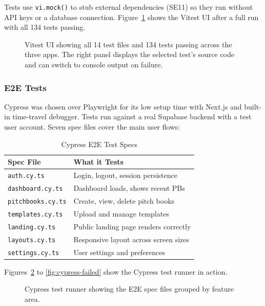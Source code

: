 Tests use \texttt{vi.mock()} to stub external dependencies (SE11) so they run without API keys or a database connection. Figure~\ref{fig:vitest-ui} shows the Vitest UI after a full run with all 134 tests passing.

\begin{figure}[H]
\centering
{}
\caption{Vitest UI showing all 14 test files and 134 tests passing across the three apps. The right panel displays the selected test's source code and can switch to console output on failure.}
\label{fig:vitest-ui}
\end{figure}

\subsubsection{E2E Tests}

Cypress \parencite{cypress2024} was chosen over Playwright for its low setup time with Next.js and built-in time-travel debugger. Tests run against a real Supabase backend with a test user account. Seven spec files cover the main user flows:

\begin{table}[H]
\centering
\begin{tabular}{|l|l|}
\hline
\rowcolor{gray!20} \textbf{Spec File} & \textbf{What it Tests} \\
\hline
\texttt{auth.cy.ts} & Login, logout, session persistence \\
\hline
\texttt{dashboard.cy.ts} & Dashboard loads, shows recent PBs \\
\hline
\texttt{pitchbooks.cy.ts} & Create, view, delete pitch books \\
\hline
\texttt{templates.cy.ts} & Upload and manage templates \\
\hline
\texttt{landing.cy.ts} & Public landing page renders correctly \\
\hline
\texttt{layouts.cy.ts} & Responsive layout across screen sizes \\
\hline
\texttt{settings.cy.ts} & User settings and preferences \\
\hline
\end{tabular}
\caption{Cypress E2E Test Specs}
\label{tab:cypress-specs}
\end{table}

Figures~\ref{fig:cypress-specs} to \ref{fig:cypress-failed} show the Cypress test runner in action.

\begin{figure}[H]
\centering
{}
\caption{Cypress test runner showing the E2E spec files grouped by feature area.}
\label{fig:cypress-specs}
\end{figure}


